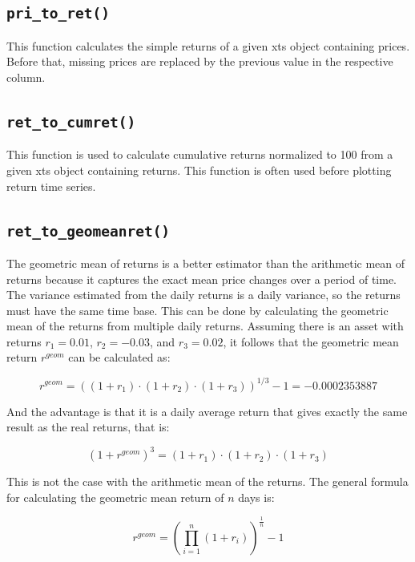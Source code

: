 \documentclass[
  oneside, a4paper, 12pt, openany]{book}
\theoremstyle{definition}
\theoremstyle{definition}
\theoremstyle{definition}
\theoremstyle{definition}
\theoremstyle{remark}
\begin{document}
\hypertarget{pritoret}{%
\subsection{\texorpdfstring{\texttt{pri\_to\_ret()}}{pri\_to\_ret()}}\label{pritoret}}

This function calculates the simple returns of a given xts object containing prices. Before that, missing prices are replaced by the previous value in the respective column.

\hypertarget{ret_to_cumret}{%
\subsection{\texorpdfstring{\texttt{ret\_to\_cumret()}}{ret\_to\_cumret()}}\label{ret_to_cumret}}

This function is used to calculate cumulative returns normalized to 100 from a given xts object containing returns. This function is often used before plotting return time series.

\hypertarget{geomeanret}{%
\subsection{\texorpdfstring{\texttt{ret\_to\_geomeanret()}}{ret\_to\_geomeanret()}}\label{geomeanret}}

The geometric mean of returns is a better estimator than the arithmetic mean of returns because it captures the exact mean price changes over a period of time. The variance estimated from the daily returns is a daily variance, so the returns must have the same time base. This can be done by calculating the geometric mean of the returns from multiple daily returns. Assuming there is an asset with returns \(r_1 = 0.01\), \(r_2=-0.03\), and \(r_3=0.02\), it follows that the geometric mean return \(r^{geom}\) can be calculated as:

\[
  r^{geom} = ((1+r_1) \cdot (1+r_2) \cdot (1+r_3))^{1/3}-1 = -0.0002353887
\]

And the advantage is that it is a daily average return that gives exactly the same result as the real returns, that is:

\[
  (1+r^{geom})^3 = (1+r_1) \cdot (1+r_2) \cdot (1+r_3)
\]

This is not the case with the arithmetic mean of the returns. The general formula for calculating the geometric mean return of \(n\) days is:

\[
  r^{geom} = (\prod_{i=1}^n (1+r_i))^{\frac{1}{n}}-1
\]
\end{document}
